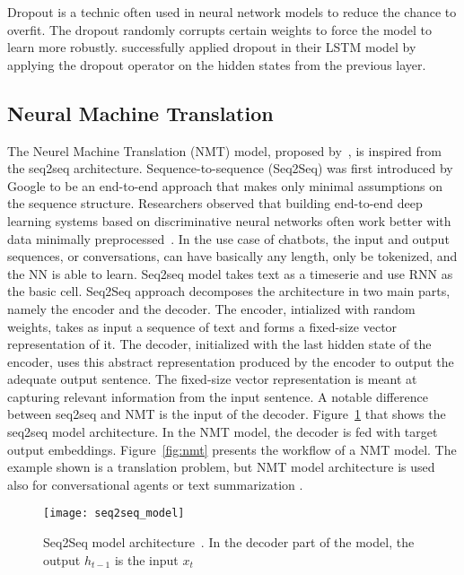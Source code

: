Dropout \citep{srivastava2014dropout} is a technic often used in neural network models to reduce the chance to overfit. The dropout randomly corrupts certain weights to force the model to learn more robustly. \citet{1409.2329} successfully applied dropout in their LSTM model by applying the dropout operator on the hidden states from the previous layer.

\subsection{Neural Machine Translation}
The Neurel Machine Translation (NMT) model, proposed by~\citet{nmt-phd}, is inspired from the seq2seq architecture. Sequence-to-sequence (Seq2Seq) was first introduced by Google \citep{1409.3215} to be an end-to-end approach that makes only minimal assumptions on the sequence structure.
Researchers observed that building end-to-end deep learning systems based on discriminative neural networks often work better with data minimally preprocessed~\citep{chen2015handbook}.
In the use case of chatbots, the input and output sequences, or conversations, can have basically any length, only be tokenized, and the NN is able to learn. Seq2seq model takes text as a timeserie and use RNN as the basic cell. Seq2Seq approach decomposes the architecture in two main parts, namely the encoder and the decoder. The encoder, intialized with random weights, takes as input a sequence of text and forms a fixed-size vector representation of it.
The decoder, initialized with the last hidden state of the encoder, uses this abstract representation produced by the encoder to output the adequate output sentence. The fixed-size vector representation is meant at capturing relevant information from the input sentence.
A notable difference between seq2seq and NMT is the input of the decoder. Figure~\ref{fig:seq2seqmodel} that shows the seq2seq model architecture. In the NMT model, the decoder is fed with target output embeddings.
Figure~\ref{fig:nmt} presents the workflow of a NMT model. The example shown is a translation problem, but NMT model architecture is used also for conversational agents or text summarization \citep{tensorflow.nmt}.

\begin{figure}
    \centering
    \texttt{[image: seq2seq\_model]}
    \decoRule
    \caption[Seq2Seq model architecture]{Seq2Seq model architecture~\citep{1409.3215}. In the decoder part of the model, the output $h_{t-1}$ is the input $x_{t}$}
    \label{fig:seq2seqmodel}
\end{figure}

